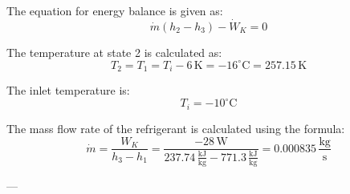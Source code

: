 The equation for energy balance is given as:  
\[
\dot{m} (h_2 - h_3) - \dot{W}_K = 0
\]

The temperature at state 2 is calculated as:  
\[
T_2 = T_1 = T_i - 6 \, \text{K} = -16^\circ\text{C} = 257.15 \, \text{K}
\]

The inlet temperature is:  
\[
T_i = -10^\circ\text{C}
\]

The mass flow rate of the refrigerant is calculated using the formula:
\[
\dot{m} = \frac{W_K}{h_3 - h_1} = \frac{-28 \, \text{W}}{237.74 \, \frac{\text{kJ}}{\text{kg}} - 771.3 \, \frac{\text{kJ}}{\text{kg}}} = 0.000835 \, \frac{\text{kg}}{\text{s}}
\]

---
